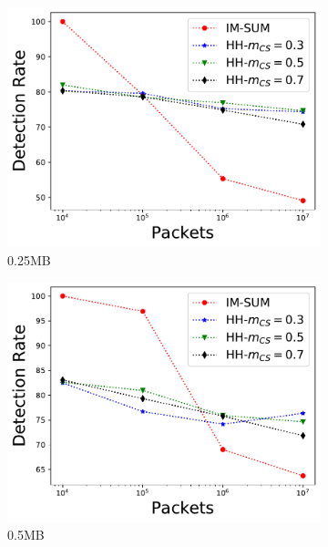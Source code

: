 \begin{figure}
\begin{subfigure}[t]{0.32\textwidth}
    \includegraphics[width=\linewidth]{HH/figures/DR_per_pkts_m=0.25.pdf}
    \caption{0.25MB}
    \label{fig:fig2_d}
\end{subfigure}\hfill
\begin{subfigure}[t]{0.32\textwidth}
    \includegraphics[width=\linewidth]{HH/figures/DR_per_pkts_m=0.5.pdf}
    \caption{0.5MB}
    \label{fig:fig2_e}
\end{subfigure}\hfill
\begin{subfigure}[t]{0.32\textwidth}

\end{subfigure}
\end{figure}
